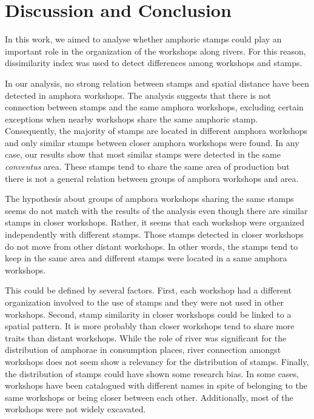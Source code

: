 \documentclass[review]{elsarticle}
\begin{document}
\section{Discussion and Conclusion}


In this work, we aimed to analyse whether amphoric stamps could play an important role in the organization of the workshops along rivers. For this reason, dissimilarity index was used to detect differences among workshops and stamps. 

In our analysis, no strong relation between stamps and spatial distance have been detected in amphora workshops. The analysis suggests that there is not connection between stamps and the same amphora workshops, excluding certain exceptions when nearby workshops share the same amphoric stamp. Consequently, the majority of stamps are located in different amphora workshops and only similar stamps between closer amphora workshops were found. In any case, our results show that most similar stamps were detected in the same \textit{conventus} area. These stamps tend to share the same area of production but there is not a general relation between groups of amphora workshops and area. 

The hypothesis about groups of amphora workshops sharing the same stamps seems do not match with the results of the analysis even though there are similar stamps in closer workshops. Rather, it seems that each workshop were organized independently with different stamps. Those stamps detected in closer workshops do not move from other distant workshops. In other words, the stamps tend to keep in the same area and different stamps were located in a same amphora workshops. 

This could be defined by several factors. First, each workshop had a different organization involved to the use of stamps and they were not used in other workshops. Second, stamp similarity in closer workshops could be linked to a spatial pattern. It is more probably than closer workshops tend to share more traits than distant workshops. While the role of river was significant for the distribution of amphorae in consumption places, river connection amongst workshops does not seem show a relevancy for the distribution of stamps. Finally, the distribution of stamps could have shown some research bias. In some cases, workshops have been catalogued with different names in spite of belonging to the same workshops or being closer between each other. Additionally, most of the workshops were not widely excavated. 
\end{document}
